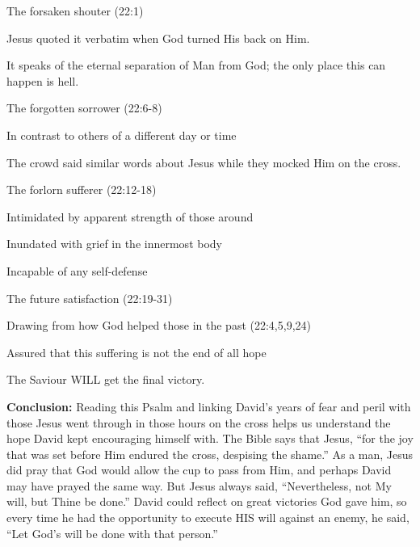 \begin{compactenum}[I.][8]
    \item The forsaken shouter (22:1)
    \begin{compactenum}[A.][8]
        \item Jesus quoted it verbatim when God turned His back on Him.
        \item It speaks of the eternal separation of Man from God; the only place this can happen is hell.
    \end{compactenum}
    \item The forgotten sorrower (22:6-8)
    \begin{compactenum}[A.][8]
        \item In contrast to others of a different day or time
        \item The crowd said similar words about Jesus while they mocked Him on the cross.
    \end{compactenum}
    \item The forlorn sufferer (22:12-18)
    \begin{compactenum}[A.][8]
        \item Intimidated by apparent strength of those around
        \item Inundated with grief in the innermost body
        \item Incapable of any self-defense
    \end{compactenum}
    \item The future satisfaction (22:19-31)
    \begin{compactenum}[A.][8]
        \item Drawing from how God helped those in the past (22:4,5,9,24)
        \item Assured that this suffering is not the end of all hope
        \item The Saviour WILL get the final victory.
    \end{compactenum}
\end{compactenum}

\noindent  \textbf{Conclusion:} Reading this Psalm and linking David’s years of fear and peril with those Jesus went through in those hours on the cross helps us understand the hope David kept encouraging himself with. The Bible says that Jesus, “for the joy that was set before Him endured the cross, despising the shame.” As a man, Jesus did pray that God would allow the cup to pass from Him, and perhaps David may have prayed the same way. But Jesus always said, “Nevertheless, not My will, but Thine be done.” David could reflect on great victories God gave him, so every time he had the opportunity to execute HIS will against an enemy, he said, “Let God’s will be done with that person.”


